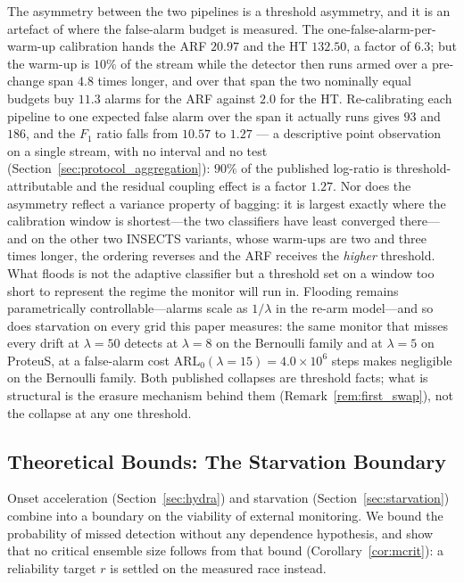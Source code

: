 \documentclass[smallextended]{svjour3}
\newcommand{\ArlFifteen}{4.0\times10^{6}}    %
\newcommand{\FloodLamArf}{20.97}             %
\newcommand{\FloodLamHt}{132.50}             %
\newcommand{\SpanOverWarm}{4.8}              %
\newcommand{\LamEqArf}{93}                   %
\newcommand{\LamEqHt}{186}                   %
\newcommand{\FaSpanArf}{11.3}                %
\newcommand{\FaSpanHt}{2.0}                  %
\newcommand{\RhoRefMeas}{10.57}              %
\newcommand{\RhoEqSpan}{1.27}                %
\newcommand{\ThresholdShare}{90}             %
\begin{document}
\begin{remark}
  The asymmetry between the two pipelines is a threshold asymmetry, and it is an artefact of where the false-alarm budget is measured. The one-false-alarm-per-warm-up calibration hands the ARF $\FloodLamArf$ and the HT $\FloodLamHt$, a factor of $6.3$; but the warm-up is $10\%$ of the stream while the detector then runs armed over a pre-change span $\SpanOverWarm$ times longer, and over that span the two nominally equal budgets buy $\FaSpanArf$ alarms for the ARF against $\FaSpanHt$ for the HT. Re-calibrating each pipeline to one expected false alarm over the span it actually runs gives $\LamEqArf$ and $\LamEqHt$, and the $F_1$ ratio falls from $\RhoRefMeas$ to $\RhoEqSpan$ --- a descriptive point observation on a single stream, with no interval and no test (Section~\ref{sec:protocol_aggregation}): $\ThresholdShare\%$ of the published log-ratio is threshold-attributable and the residual coupling effect is a factor $\RhoEqSpan$. Nor does the asymmetry reflect a variance property of bagging: it is largest exactly where the calibration window is shortest---the two classifiers have least converged there---and on the other two INSECTS variants, whose warm-ups are two and three times longer, the ordering reverses and the ARF receives the \emph{higher} threshold. What floods is not the adaptive classifier but a threshold set on a window too short to represent the regime the monitor will run in. Flooding remains parametrically controllable---alarms scale as $1/\lambda$ in the re-arm model---and so does starvation on every grid this paper measures: the same monitor that misses every drift at $\lambda = 50$ detects at $\lambda = 8$ on the Bernoulli family and at $\lambda = 5$ on ProteuS, at a false-alarm cost $\mathrm{ARL}_0(\lambda = 15) = \ArlFifteen$ steps makes negligible on the Bernoulli family. Both published collapses are threshold facts; what is structural is the erasure mechanism behind them (Remark~\ref{rem:first_swap}), not the collapse at any one threshold.
\end{remark}

\subsection{Theoretical Bounds: The Starvation Boundary}\label{sec:starvation_boundary}

Onset acceleration (Section~\ref{sec:hydra}) and starvation (Section~\ref{sec:starvation}) combine into a boundary on the viability of external monitoring.
We bound the probability of missed detection without any dependence hypothesis, and show that no critical ensemble size follows from that bound (Corollary~\ref{cor:mcrit}): a reliability target $r$ is settled on the measured race instead.
\end{document}
